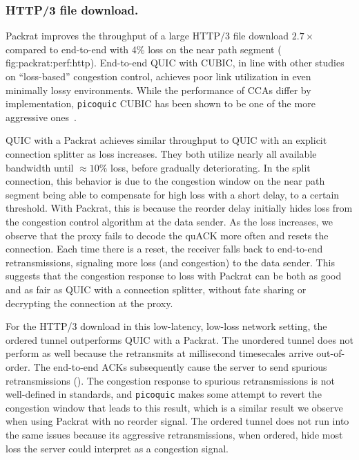 \subsubsection{HTTP/3 file download.}
Packrat improves the throughput of a large HTTP/3 file download
$2.7\times$
compared to end-to-end with 4\% loss on the near path segment (\Cref
{fig:packrat:perf:http}). End-to-end QUIC with CUBIC, in line with other studies on
``loss-based'' congestion control, achieves poor link utilization in even
minimally lossy environments. While the performance of CCAs differ by
implementation, \texttt{picoquic} CUBIC has been shown to be one of the more
aggressive ones~\cite{yuan2025internet}.

QUIC with a Packrat achieves similar throughput to QUIC with an explicit
connection splitter as loss increases. They both utilize nearly all available
bandwidth until $\approx\!10\%$ loss, before gradually deteriorating. In the
split connection, this behavior is due to the congestion window on the near
path segment being able to compensate for high loss with a short delay, to a
certain threshold. With Packrat, this is because the reorder delay initially
hides loss from the congestion control algorithm at the data sender. As the
loss increases, we observe that the proxy fails to decode the quACK more often
and resets the connection. Each time there is a reset, the receiver falls back
to end-to-end retransmissions, signaling more loss (and congestion) to the data
sender. This suggests that the congestion response to loss with Packrat can be
both as good and as fair as QUIC with a connection splitter, without fate
sharing or decrypting the connection at the proxy.



For the HTTP/3 download in this low-latency, low-loss network setting, the
ordered tunnel outperforms QUIC with a Packrat. The unordered tunnel does not
perform as well because the retransmits at millisecond timesecales arrive
out-of-order. The end-to-end ACKs subsequently cause the server to send
spurious retransmissions (). The congestion response to
spurious retransmissions is not well-defined in standards, and \texttt
{picoquic} makes some attempt to revert the congestion window that leads to
this result, which is a similar result we observe when using Packrat with no
reorder signal. The ordered tunnel does not run into the same issues because
its aggressive retransmissions, when ordered, hide most loss the server could
interpret as a congestion signal.

